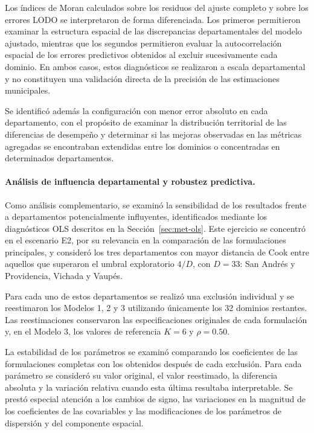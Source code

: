 Los índices de Moran calculados sobre los residuos del ajuste completo y sobre los errores LODO se interpretaron de forma diferenciada. Los primeros permitieron examinar la estructura espacial de las discrepancias departamentales del modelo ajustado, mientras que los segundos permitieron evaluar la autocorrelación espacial de los errores predictivos obtenidos al excluir sucesivamente cada dominio. En ambos casos, estos diagnósticos se realizaron a escala departamental y no constituyen una validación directa de la precisión de las estimaciones municipales.

Se identificó además la configuración con menor error absoluto en cada departamento, con el propósito de examinar la distribución territorial de las diferencias de desempeño y determinar si las mejoras observadas en las métricas agregadas se encontraban extendidas entre los dominios o concentradas en determinados departamentos.

\paragraph{Análisis de influencia departamental y robustez predictiva.}

Como análisis complementario, se examinó la sensibilidad de los resultados frente a departamentos potencialmente influyentes, identificados mediante los diagnósticos OLS descritos en la Sección~\ref{sec:met-ols}. Este ejercicio se concentró en el escenario E2, por su relevancia en la comparación de las formulaciones principales, y consideró los tres departamentos con mayor distancia de Cook entre aquellos que superaron el umbral exploratorio $4/D$, con $D=33$: San Andrés y Providencia, Vichada y Vaupés.

Para cada uno de estos departamentos se realizó una exclusión individual y se reestimaron los Modelos 1, 2 y 3 utilizando únicamente los 32 dominios restantes. Las reestimaciones conservaron las especificaciones originales de cada formulación y, en el Modelo 3, los valores de referencia $K=6$ y $\rho=0.50$.

La estabilidad de los parámetros se examinó comparando los coeficientes de las formulaciones completas con los obtenidos después de cada exclusión. Para cada parámetro se consideró su valor original, el valor reestimado, la diferencia absoluta y la variación relativa cuando esta última resultaba interpretable. Se prestó especial atención a los cambios de signo, las variaciones en la magnitud de los coeficientes de las covariables y las modificaciones de los parámetros de dispersión y del componente espacial.

